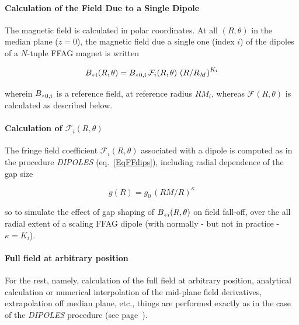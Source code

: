 \paragraph{Calculation of the Field Due to a Single Dipole} 

 \noindent The magnetic field is calculated in  polar
coordinates.  At all $(R,\theta)$ in the median plane ($z=0$), the 
magnetic field  due  a single one (index $i$) of the  dipoles  of a $N$-tuple FFAG  magnet is written 

$$ {B_z}_i(R,\theta) =  {B_z}_{0,i} \, \mathcal{F}_i(R,\theta) \, \left(   R/R_M \right)^{K_i}  $$

\noindent wherein ${B_z}_{0,i}$  is a reference field, at reference radius  $RM_{i}$, 
 whereas $ \mathcal{F}(R,\theta)$ is calculated as described below. 



\paragraph{Calculation of $\mathcal{F}_i(R,\theta) $} 

\noindent The fringe field coefficient  $\mathcal{F}_i(R,\theta) $ associated with a  dipole is computed as in the 
procedure  \textsl{DIPOLES} (eq.~\ref{EqFFdips}), including  radial dependence of the gap size 

\begin{equation}
g(R) = g_0 \, (RM/R)^{\kappa}
\end{equation}

\noindent  so to simulate the effect of gap shaping of $ {B_z}_i(R,\theta)$ on 
field fall-off,  over the 
all radial extent of a scaling FFAG dipole (with normally - but not in practice - $\kappa = K_i$). 
 

\bigskip

\paragraph{Full field at arbitrary position }

For the rest, namely, calculation of the full field at arbitrary position, 
analytical   calculation or numerical interpolation of the  mid-plane field derivatives, 
extrapolation off median plane, etc., things are performed exactly as in the case of the 
 \textsl{DIPOLES} procedure (see page~\pageref{FFatAP}). 





\newpage

